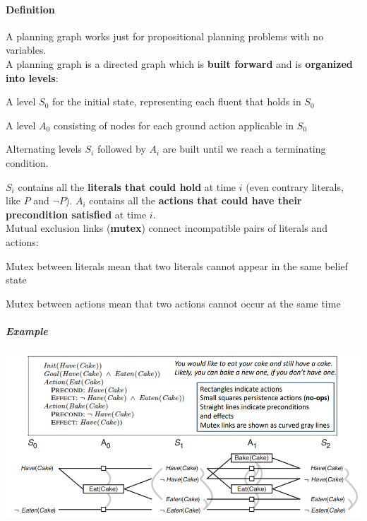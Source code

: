 \documentclass[10pt]{report}
\begin{document}
\paragraph{Definition} A planning graph works just for propositional planning problems with no variables.\\
A planning graph is a directed graph which is \textbf{built forward} and is \textbf{organized into levels}:\begin{list}{}{}
	\item A level $S_0$ for the initial state, representing each fluent that holds in $S_0$
	\item A level $A_0$ consisting of nodes for each ground action applicable in $S_0$
	\item Alternating levels $S_i$ followed by $A_i$ are built until we reach a terminating condition.
\end{list}
$S_i$ contains all the \textbf{literals that could hold} at time $i$ (even contrary literals, like $P$ and $\neg P$). $A_i$ contains all the \textbf{actions that could have their precondition satisfied} at time $i$.\\
Mutual exclusion links (\textbf{mutex}) connect incompatible pairs of literals and actions:\begin{list}{}{}
	\item Mutex between literals mean that two literals cannot appear in the same belief state
	\item Mutex between actions mean that two actions cannot occur at the same time
\end{list}
\subparagraph{Example}
\begin{center}
	\includegraphics[scale=0.7]{25.png}
\end{center}
\end{document}
